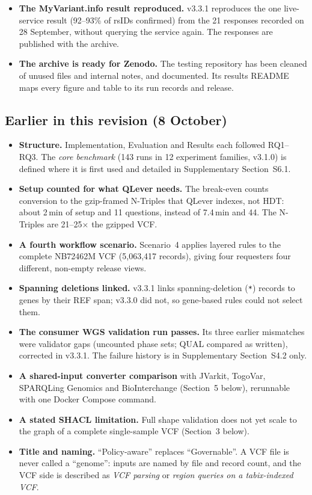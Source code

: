 \documentclass[10pt]{article}
\begin{document}
\begin{itemize}
\item \textbf{The MyVariant.info result reproduced.} v3.3.1 reproduces the one live-service result (92--93\% of rsIDs confirmed) from the 21 responses recorded on 28 September, without querying the service again. The responses are published with the archive.
\item \textbf{The archive is ready for Zenodo.} The testing repository has been cleaned of unused files and internal notes, and documented. Its results README maps every figure and table to its run records and release.
\end{itemize}

\subsection{Earlier in this revision (8 October)}
\begin{itemize}
\item \textbf{Structure.} Implementation, Evaluation and Results each followed RQ1--RQ3. The \emph{core benchmark} (143 runs in 12 experiment families, v3.1.0) is defined where it is first used and detailed in Supplementary Section~S6.1.
\item \textbf{Setup counted for what QLever needs.} The break-even counts conversion to the gzip-framed N-Triples that QLever indexes, not HDT: about 2\,min of setup and 11 questions, instead of 7.4\,min and 44. The N-Triples are 21--25$\times$ the gzipped VCF.
\item \textbf{A fourth workflow scenario.} Scenario~4 applies layered rules to the complete NB72462M VCF (5,063,417 records), giving four requesters four different, non-empty release views.
\item \textbf{Spanning deletions linked.} v3.3.1 links spanning-deletion (\texttt{*}) records to genes by their REF span; v3.3.0 did not, so gene-based rules could not select them.
\item \textbf{The consumer WGS validation run passes.} Its three earlier mismatches were validator gaps (uncounted phase sets; QUAL compared as written), corrected in v3.3.1. The failure history is in Supplementary Section~S4.2 only.
\item \textbf{A shared-input converter comparison} with JVarkit, TogoVar, SPARQLing Genomics and BioInterchange (Section~5 below), rerunnable with one Docker Compose command.
\item \textbf{A stated SHACL limitation.} Full shape validation does not yet scale to the graph of a complete single-sample VCF (Section~3 below).
\item \textbf{Title and naming.} ``Policy-aware'' replaces ``Governable''. A VCF file is never called a ``genome'': inputs are named by file and record count, and the VCF side is described as \emph{VCF parsing} or \emph{region queries on a tabix-indexed VCF}.
\end{itemize}
\end{document}
